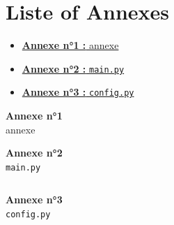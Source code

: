\begin{subappendices}

\hypertarget{annexes_toc}{}
\chapter*{Liste of Annexes}

\begin{itemize}[label=\textbullet]
  \item \hyperlink{annexe:1}{\textbf{Annexe n°1 :} annexe}
  \item \hyperlink{annexe:2}{\textbf{Annexe n°2 :} \texttt{main.py}}
  \item \hyperlink{annexe:3}{\textbf{Annexe n°3 :} \texttt{config.py}}
\end{itemize}
\newpage

\hypertarget{annexe:1}{}
\thispagestyle{empty}\vspace*{\fill}\begin{center}\Huge\textbf{Annexe n°1}\\[0.5cm]\Large annexe\end{center}\vspace*{\fill}\newpage\pagestyle{fancy}
\newpage
{}\hypertarget{annexe:2}{}
\thispagestyle{empty}\vspace*{\fill}\begin{center}\Huge\textbf{Annexe n°2}\\[0.5cm]\Large \texttt{main.py}\end{center}\vspace*{\fill}\clearpage\pagestyle{fancy}
\inputminted[linenos=true, frame=lines, framesep=2mm, fontsize=\footnotesize, breaklines=true]{python}{annexes/scripts/main.py}\newpage
{}\hypertarget{annexe:3}{}
\thispagestyle{empty}\vspace*{\fill}\begin{center}\Huge\textbf{Annexe n°3}\\[0.5cm]\Large \texttt{config.py}\end{center}\vspace*{\fill}\clearpage\pagestyle{fancy}
\inputminted[linenos=true, frame=lines, framesep=2mm, fontsize=\footnotesize, breaklines=true]{python}{annexes/scripts/src/python/config.py}\newpage
\end{subappendices}
